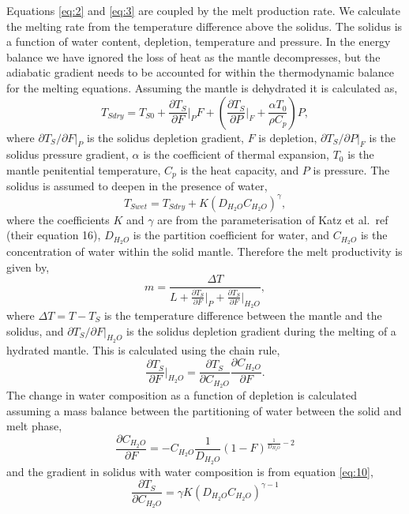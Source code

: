 \documentclass[a4paper,11pt,onecolumn]{article}
\begin{document}
Equations \ref{eq:2} and \ref{eq:3} are coupled by the melt production rate. We calculate the melting rate from the temperature difference above the solidus. The solidus is a function of water content, depletion, temperature and pressure. In the energy balance we have ignored the loss of heat as the mantle decompresses, but the adiabatic gradient needs to be accounted for within the thermodynamic balance for the melting equations. Assuming the mantle is dehydrated it is calculated as,
\begin{equation}
T_{Sdry} = T_{S0} + \frac{\partial T_{S}}{\partial F}\vert_{P}F + \left(\frac{\partial T_{S}}{\partial P}\vert_{F} + \frac{\alpha T_{0}}{\rho C_{p}}\right)P,
\label{eq:9}
\end{equation}
where $\partial T_{S}/\partial F\vert_{P}$ is the solidus depletion gradient, $F$ is depletion, $\partial T_{S}/\partial P\vert_{F}$ is the solidus pressure gradient, $\alpha$ is the coefficient of thermal expansion, $T_{0}$ is the mantle penitential temperature, $C_{p}$ is the heat capacity, and $P$ is pressure. The solidus is assumed to deepen in the presence of water,
\begin{equation}
T_{Swet} = T_{Sdry} + K\left(D_{H_{2}O}C_{H_{2}O}\right)^{\gamma},
\label{eq:10}
\end{equation}
where the coefficients $K$ and $\gamma$ are from the parameterisation of Katz et al.~ref \cite{katz-etal-2003} (their equation 16), $D_{H_{2}O}$ is the partition coefficient for water, and $C_{H_{2}O}$ is the concentration of water within the solid mantle. Therefore the melt productivity is given by,
\begin{equation}
m = \frac{\Delta T}{L + \frac{\partial T_{S}}{\partial F}\vert_{P} + \frac{\partial T_{S}}{\partial F}\vert_{H_{2}O}},
\label{eq:11}
\end{equation}
where $\Delta T = T-T_{S}$ is the temperature difference between the mantle and the solidus, and $\partial T_{S}/\partial F\vert_{H_{2}O}$ is the solidus depletion gradient during the melting of a hydrated mantle. This is calculated using the chain rule,
\begin{equation}
\frac{\partial T_{S}}{\partial F}\vert_{H_{2}O} = \frac{\partial T_{S}}{\partial C_{H_{2}O}} \frac{\partial C_{H_{2}O}}{\partial F}.
\label{eq:12}
\end{equation}
The change in water composition as a function of depletion is calculated  assuming a mass balance between the partitioning of water between the solid and melt phase,
\begin{equation}
\frac{\partial C_{H_{2}O}}{\partial F} = -C_{H_{2}O} \frac{1}{D_{H_{2}O}}\left(1-F\right)^{\frac{1}{D_{H_{2}O}}-2}
\label{eq:13}
\end{equation}
and the gradient in solidus with water composition is from equation \ref{eq:10},
\begin{equation}
\frac{\partial T_{S}}{\partial C_{H_{2}O}} = \gamma K\left(D_{H_{2}O}C_{H_{2}O}\right)^{\gamma-1}
\label{eq:14}
\end{equation}
\end{document}
